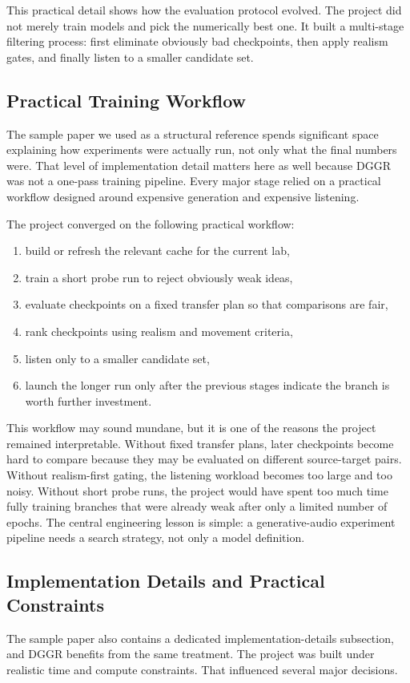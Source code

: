 \documentclass[conference]{IEEEtran}
\begin{document}
This practical detail shows how the evaluation protocol evolved. The project did not merely train models and pick the numerically best one. It built a multi-stage filtering process: first eliminate obviously bad checkpoints, then apply realism gates, and finally listen to a smaller candidate set.

\subsection{Practical Training Workflow}
The sample paper we used as a structural reference spends significant space explaining how experiments were actually run, not only what the final numbers were. That level of implementation detail matters here as well because DGGR was not a one-pass training pipeline. Every major stage relied on a practical workflow designed around expensive generation and expensive listening.

The project converged on the following practical workflow:
\begin{enumerate}[leftmargin=1.5em]
    \item build or refresh the relevant cache for the current lab,
    \item train a short probe run to reject obviously weak ideas,
    \item evaluate checkpoints on a fixed transfer plan so that comparisons are fair,
    \item rank checkpoints using realism and movement criteria,
    \item listen only to a smaller candidate set,
    \item launch the longer run only after the previous stages indicate the branch is worth further investment.
\end{enumerate}

This workflow may sound mundane, but it is one of the reasons the project remained interpretable. Without fixed transfer plans, later checkpoints become hard to compare because they may be evaluated on different source-target pairs. Without realism-first gating, the listening workload becomes too large and too noisy. Without short probe runs, the project would have spent too much time fully training branches that were already weak after only a limited number of epochs. The central engineering lesson is simple: a generative-audio experiment pipeline needs a search strategy, not only a model definition.

\subsection{Implementation Details and Practical Constraints}
The sample paper also contains a dedicated implementation-details subsection, and DGGR benefits from the same treatment. The project was built under realistic time and compute constraints. That influenced several major decisions.
\end{document}
